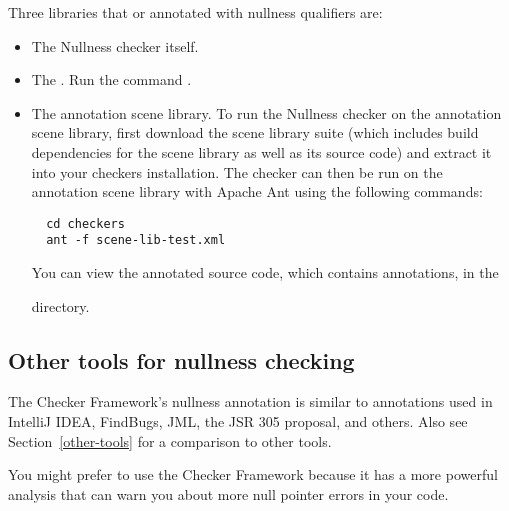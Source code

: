 Three libraries that or annotated with nullness qualifiers are:

\begin{itemize}
\item
The Nullness checker itself.

\item
The 
.
Run the command .

\item
The annotation scene library.
To run the Nullness checker on the annotation scene library,
first download the scene library suite (which includes build
dependencies for the scene library as well as its source code) and extract it
into your checkers installation. The checker can then be run on the annotation
scene library with Apache Ant using the following commands:

\begin{Verbatim}
  cd checkers
  ant -f scene-lib-test.xml
\end{Verbatim}


You can view the annotated source code, which contains  annotations, in
the
\begin{smaller}
\end{smaller}
directory.

\end{itemize}


\subsection{Other tools for nullness checking\label{nullness-related-work}}

\newcommand{\linktoNonNull}{\code{\refclass{nullness/quals}{NonNull}}}
\newcommand{\linktoNullable}{\code{\refclass{nullness/quals}{Nullable}}}

The Checker Framework's nullness annotation is similar to annotations used
in IntelliJ IDEA, FindBugs, JML, the JSR 305 proposal, and others.  Also
see Section~\ref{other-tools} for a comparison to other tools.

You might prefer to use the Checker Framework because it has a more
powerful analysis that can warn you about more null pointer errors in your
code.

